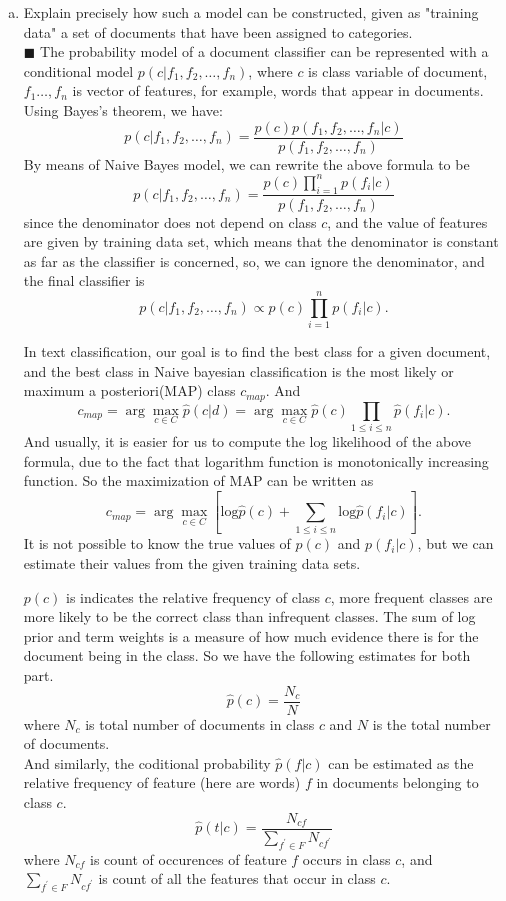 \documentclass{article}
\newcommand{\solution}[1]{~\\ $\blacksquare$ \sffamily\upshape\selectfont #1
\normalfont ~\\~ }
\begin{document}
\begin{enumerate}[a.]
\item Explain precisely how such a model can be constructed, given as
  "training data" a set of documents that have been assigned to
  categories.
  \solution{
    The probability model of a document classifier can be represented
    with a conditional model $p(c|f_1,f_2,\ldots,f_n)$, where $c$ is
    class variable of document, $f_1\ldots, f_n$ is vector of features,
    for example, words that appear in documents. \\
    Using Bayes's theorem, we have: \\
    \[ p(c|f_1,f_2,\ldots,f_n) =
    \frac{p(c)p(f_1,f_2,\ldots,f_n|c)}{p(f_1,f_2,\ldots, f_n)} \]
    By means of Naive Bayes model, we can rewrite the above formula to
    be 
    \[ p(c|f_1,f_2,\ldots,f_n) =
    \frac{p(c)\prod_{i=1}^np(f_i|c)}{p(f_1,f_2,\ldots, f_n)} \]
    since the denominator does not depend on class $c$, and the value of
    features are given by training data set, which means that the
    denominator is constant as far as the classifier is concerned,
    so, we can ignore the denominator, and the final classifier is 
    \[ p(c|f_1,f_2,\ldots,f_n) \propto p(c)\prod_{i=1}^np(f_i|c). \]

    In text classification, our goal is to find the best class for a given
    document, and the best class in Naive bayesian classification is
    the most likely or maximum a posteriori(MAP) class $c_{map}$. And 
    \[ c_{map} = \arg\max_{c\in C}\hat{p}(c|d)=\arg\max_{c\in
      C}\hat{p}(c)\prod_{1\leq i \leq n}\hat{p}(f_i|c). \]
    And usually, it is easier for us to compute the log likelihood of
    the above formula, due to the fact that logarithm function is
    monotonically increasing function. So the maximization of MAP can
    be written as 
    \[ c_{map}=\arg\max_{c\in C}[\mbox{log}\hat{p}(c)+\sum_{1\leq i \leq
      n}\mbox{log}\hat{p}(f_i|c)]. \]
    It is not possible to know the true values of $p(c)$ and
    $p(f_i|c)$, but we can estimate their values from the given
    training data sets. 

    $p(c)$ is indicates the relative frequency of class $c$, more
    frequent classes are more likely to be the correct class than
    infrequent classes. The sum of log prior and term weights is a
    measure of how much evidence there is for the document being in
    the class. So we have the following estimates for both part. 
    \[ \hat{p}(c)=\frac{N_c}{N} \]
    where $N_c$ is total number of documents in class $c$ and $N$ is
    the total number of documents. \\ 
    And similarly, the coditional probability $\hat{p}(f|c)$ can be
    estimated as the relative frequency of feature (here are words)
    $f$ in documents belonging to class $c$. 
    \[ \hat{p}(t|c)=\frac{N_{cf}}{\sum_{f^{\prime}\in F}N_{cf^{\prime}}} \]
    where $N_{cf}$ is count of occurences of feature $f$ occurs in
    class $c$, and $\sum_{f^{\prime}\in F}N_{cf^{\prime}}$ is count of all the
    features that occur in class $c$. 

}
\end{enumerate}
\end{document}
